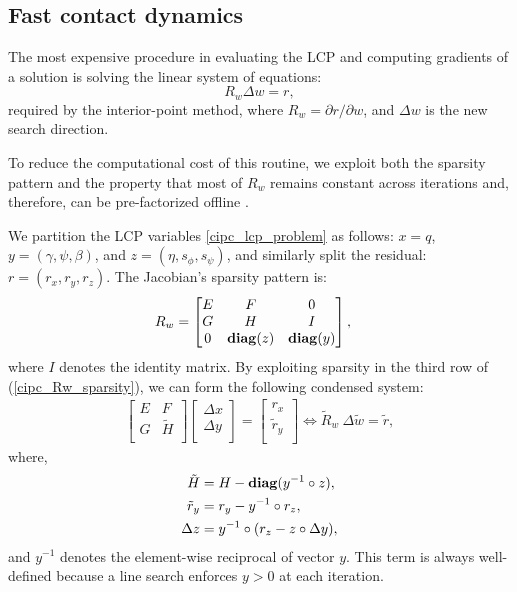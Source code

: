 \subsection{Fast contact dynamics}
The most expensive procedure in evaluating the LCP and computing gradients of a solution is solving the linear system of equations:
\begin{equation}
	R_w \Delta w = r, \label{cipc_naive_solve}
\end{equation}
required by the interior-point method, where $R_w = \partial r / \partial w$, and $\Delta w$ is the new search direction. 

To reduce the computational cost of this routine, we exploit both the sparsity pattern and the property that most of $R_w$ remains constant across iterations and, therefore, can be pre-factorized offline \cite{yamazaki2017structure}. 

We partition the LCP variables \eqref{cipc_lcp_problem} as follows: $x = q$, $y = (\gamma, \psi, \beta)$, and $z = (\eta, s_{\phi}, s_{\psi})$, and similarly split the residual: $r = (r_x, r_y, r_z)$. The Jacobian's sparsity pattern is:
\begin{align}
	R_w &= \begin{bmatrix}
		E & F & 0 \\
		G & H & I \\
		0 & \mbox{\textbf{diag}}(z) & \mbox{\textbf{diag}}(y)
	\end{bmatrix}, \label{cipc_Rw_sparsity}
\end{align}
where $I$ denotes the identity matrix. By exploiting sparsity in the third row of (\ref{cipc_Rw_sparsity}), we can form the following condensed system:
\begin{align}
	\begin{bmatrix}
		E & F \\
		G & \tilde{H} \\
	\end{bmatrix}
	\begin{bmatrix}
		\Delta x \\
		\Delta y \\
	\end{bmatrix}
	= 
	\begin{bmatrix}
		r_x \\
		\tilde{r}_y \\
	\end{bmatrix} \Leftrightarrow \tilde{R}_w \: \Delta \tilde{w} = \tilde{r},
	\label{cipc_Rw_reduced}
\end{align}
where,
\begin{align}
	\tilde{H} &= H - \mbox{\textbf{diag}}(y^{-1} \circ z), \\
	\tilde{r}_y &= r_y - y^{-1} \circ r_z, \\
	\Delta z &= y^{-1} \circ (r_z - z \circ \Delta y),
	\label{cipc_delta_w3}
\end{align}
and $y^{-1}$ denotes the element-wise reciprocal of vector $y$. This term is always well-defined because a line search enforces $y > 0$ at each iteration. 

